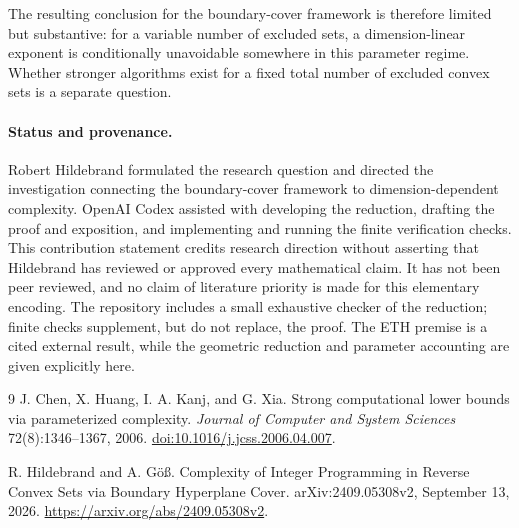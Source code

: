 \documentclass[11pt]{article}
\begin{document}
The resulting conclusion for the boundary-cover framework is therefore limited but substantive: for a variable number of excluded sets, a dimension-linear exponent is conditionally unavoidable somewhere in this parameter regime. Whether stronger algorithms exist for a fixed total number of excluded convex sets is a separate question.

\paragraph{Status and provenance.}
Robert Hildebrand formulated the research question and directed the investigation connecting the boundary-cover framework to dimension-dependent complexity. OpenAI Codex assisted with developing the reduction, drafting the proof and exposition, and implementing and running the finite verification checks. This contribution statement credits research direction without asserting that Hildebrand has reviewed or approved every mathematical claim. It has not been peer reviewed, and no claim of literature priority is made for this elementary encoding. The repository includes a small exhaustive checker of the reduction; finite checks supplement, but do not replace, the proof. The ETH premise is a cited external result, while the geometric reduction and parameter accounting are given explicitly here.

\begin{thebibliography}{9}
J. Chen, X. Huang, I. A. Kanj, and G. Xia.
\newblock Strong computational lower bounds via parameterized complexity.
\newblock \emph{Journal of Computer and System Sciences} 72(8):1346--1367, 2006.
\newblock \href{https://doi.org/10.1016/j.jcss.2006.04.007}{doi:10.1016/j.jcss.2006.04.007}.

R. Hildebrand and A. G\"o\ss.
\newblock Complexity of Integer Programming in Reverse Convex Sets via Boundary Hyperplane Cover.
\newblock arXiv:2409.05308v2, September 13, 2026.
\newblock \url{https://arxiv.org/abs/2409.05308v2}.
\end{thebibliography}
\end{document}
